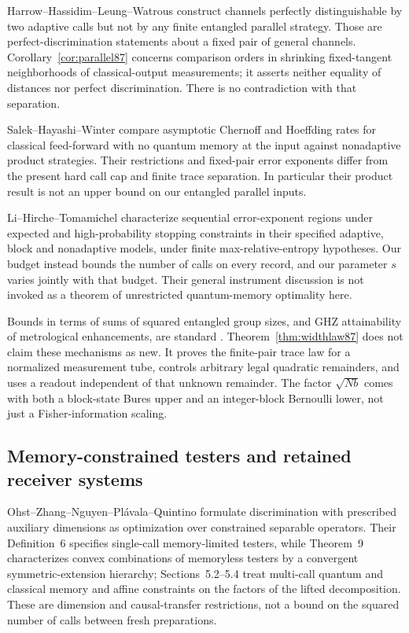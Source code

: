 Harrow--Hassidim--Leung--Watrous \cite[Sections~3--4]{HHLW87}
construct channels perfectly distinguishable by two adaptive calls
but not by any finite entangled parallel strategy.  Those are
perfect-discrimination statements about a fixed pair of general
channels.  Corollary~\ref{cor:parallel87} concerns comparison orders
in shrinking fixed-tangent neighborhoods of classical-output
measurements; it asserts neither equality of distances nor perfect
discrimination.  There is no contradiction with that separation.

Salek--Hayashi--Winter \cite[Theorem~9 and Remark~10]{SHW87}
compare asymptotic Chernoff and Hoeffding rates for classical
feed-forward with no quantum memory at the input against nonadaptive
product strategies.  Their restrictions and fixed-pair error
exponents differ from the present hard call cap and finite trace
separation.  In particular their product result is not an upper
bound on our entangled parallel inputs.

Li--Hirche--Tomamichel \cite[Theorems~3.1--3.3]{LHT87}
characterize sequential error-exponent regions under expected and
high-probability stopping constraints in their specified adaptive,
block and nonadaptive models, under finite max-relative-entropy
hypotheses.  Our budget instead bounds the number of calls on every
record, and our parameter $s$ varies jointly with that budget.
Their general instrument discussion is not invoked as a theorem of
unrestricted quantum-memory optimality here.

Bounds in terms of sums of squared entangled group sizes, and GHZ
attainability of metrological enhancements, are standard
\cite{Hyllus78,Toth78}.  Theorem~\ref{thm:widthlaw87} does not
claim these mechanisms as new.  It proves the finite-pair trace law
for a normalized measurement tube, controls arbitrary legal quadratic
remainders, and uses a readout independent of that unknown remainder.
The factor $\sqrt{Nb}$ comes with both a block-state Bures upper and
an integer-block Bernoulli lower, not just a Fisher-information scaling.


\subsection{Memory-constrained testers and retained receiver systems}
Ohst--Zhang--Nguyen--Pl\'avala--Quintino \cite{OZNPQ89}
formulate discrimination with prescribed auxiliary dimensions as
optimization over constrained separable operators.  Their
Definition~6 specifies single-call memory-limited testers, while
Theorem~9 characterizes convex combinations of memoryless testers
by a convergent symmetric-extension hierarchy;
Sections~5.2--5.4 treat multi-call quantum and classical memory
and affine constraints on the factors of the lifted decomposition.
These are dimension and causal-transfer restrictions, not a bound on
the squared number of calls between fresh preparations.

